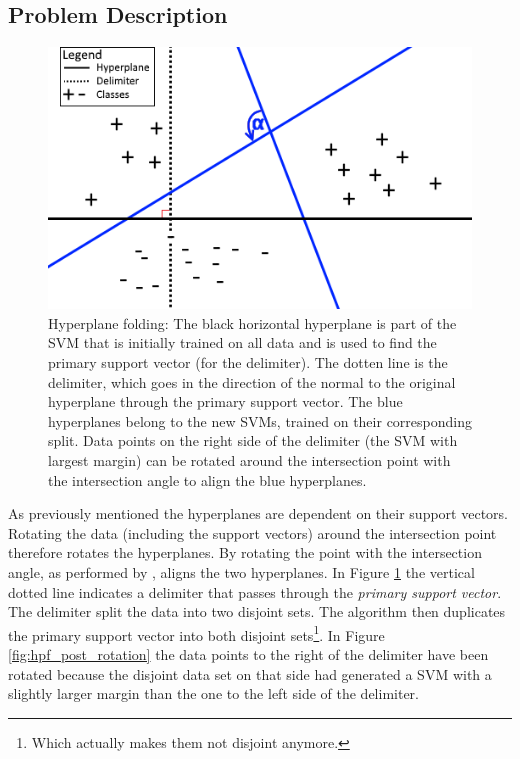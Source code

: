 \documentclass[a4paper,twoside]{bth}
\begin{document}
\subsection{Problem Description}
\label{Problem description}
\begin{figure}
\centering
\includegraphics[scale=1]{images/intro-images/hyperplaneExplanation1_6.png}

   \caption{Hyperplane folding: The black horizontal hyperplane is part of the SVM that is initially trained on all data and is used to find the primary support vector (for the delimiter). The dotten line is the delimiter, which goes in the direction of the normal to the original hyperplane through the primary support vector. The blue hyperplanes belong to the new SVMs, trained on their corresponding split. Data points on the right side of the delimiter (the SVM with largest margin) can be rotated around the intersection point with the intersection angle to align the blue hyperplanes.}
   \label{fig:hpf_pre_rotation}
\end{figure}
As previously mentioned the hyperplanes are dependent on their support vectors. Rotating the data (including the support vectors) around the intersection point therefore rotates the hyperplanes. By rotating the point with the intersection angle, as performed by \cite{unpublished}, aligns the two hyperplanes. In Figure \ref{fig:hpf_pre_rotation} the vertical dotted line indicates a delimiter that passes through the \textit{primary support vector}. The delimiter split the data into two disjoint sets. The algorithm then duplicates the primary support vector into both disjoint sets\footnote{Which actually makes them not disjoint anymore.}. In Figure \ref{fig:hpf_post_rotation} the data points to the right of the delimiter have been rotated because the disjoint data set on that side had generated a SVM with a slightly larger margin \cite{unpublished} than the one to the left side of the delimiter.
\end{document}
